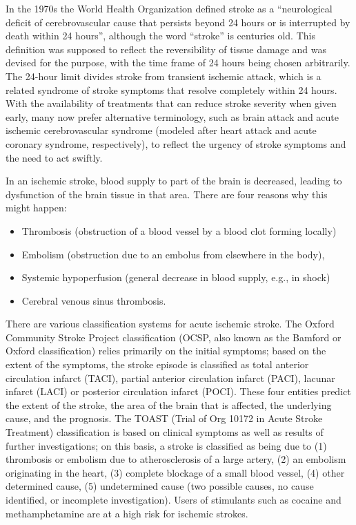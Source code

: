 In the 1970s the World Health Organization defined stroke as a
``neurological deficit of cerebrovascular cause that persists beyond 24
hours or is interrupted by death within 24 hours'', although the word
``stroke'' is centuries old. This definition was supposed to reflect the
reversibility of tissue damage and was devised for the purpose, with the
time frame of 24 hours being chosen arbitrarily. The 24-hour limit
divides stroke from transient ischemic attack, which is a related
syndrome of stroke symptoms that resolve completely within 24 hours.
With the availability of treatments that can reduce stroke severity when
given early, many now prefer alternative terminology, such as brain
attack and acute ischemic cerebrovascular syndrome (modeled after heart
attack and acute coronary syndrome, respectively), to reflect the
urgency of stroke symptoms and the need to act swiftly.

In an ischemic stroke, blood supply to part of the brain is decreased,
leading to dysfunction of the brain tissue in that area. There are four
reasons why this might happen:

\begin{itemize}
\tightlist
\item
  Thrombosis (obstruction of a blood vessel by a blood clot forming
  locally)
\item
  Embolism (obstruction due to an embolus from elsewhere in the body),
\item
  Systemic hypoperfusion (general decrease in blood supply, e.g., in
  shock)
\item
  Cerebral venous sinus thrombosis.
\end{itemize}

There are various classification systems for acute ischemic stroke. The
Oxford Community Stroke Project classification (OCSP, also known as the
Bamford or Oxford classification) relies primarily on the initial
symptoms; based on the extent of the symptoms, the stroke episode is
classified as total anterior circulation infarct (TACI), partial
anterior circulation infarct (PACI), lacunar infarct (LACI) or posterior
circulation infarct (POCI). These four entities predict the extent of
the stroke, the area of the brain that is affected, the underlying
cause, and the prognosis. The TOAST (Trial of Org 10172 in Acute Stroke
Treatment) classification is based on clinical symptoms as well as
results of further investigations; on this basis, a stroke is classified
as being due to (1) thrombosis or embolism due to atherosclerosis of a
large artery, (2) an embolism originating in the heart, (3) complete
blockage of a small blood vessel, (4) other determined cause, (5)
undetermined cause (two possible causes, no cause identified, or
incomplete investigation). Users of stimulants such as cocaine and
methamphetamine are at a high risk for ischemic strokes.

